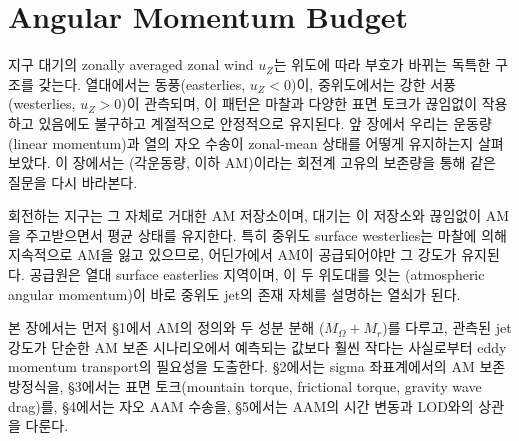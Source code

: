 %

\section{Angular Momentum Budget}

지구 대기의 zonally averaged zonal wind $u_Z$는 위도에 따라 부호가 바뀌는
독특한 구조를 갖는다.  열대에서는 동풍(easterlies, $u_Z < 0$)이, 중위도에서는
강한 서풍(westerlies, $u_Z > 0$)이 관측되며, 이 패턴은 마찰과 다양한
표면 토크가 끊임없이 작용하고 있음에도 불구하고 계절적으로 안정적으로 유지된다.
앞 장에서 우리는 운동량(linear momentum)과 열의 자오 수송이 zonal-mean 상태를
어떻게 유지하는지 살펴보았다.  이 장에서는  (각운동량,
이하 AM)이라는 회전계 고유의 보존량을 통해 같은 질문을 다시 바라본다.

회전하는 지구는 그 자체로 거대한 AM 저장소이며, 대기는 이 저장소와 끊임없이
AM을 주고받으면서 평균 상태를 유지한다.  특히 중위도 surface westerlies는 마찰에
의해 지속적으로 AM을 잃고 있으므로, 어딘가에서 AM이 공급되어야만 그 강도가
유지된다.  공급원은 열대 surface easterlies 지역이며, 이 두 위도대를 잇는
 (atmospheric angular momentum)이 바로
중위도 jet의 존재 자체를 설명하는 열쇠가 된다.

본 장에서는 먼저 \S1에서 AM의 정의와 두 성분 분해 ($M_\Omega + M_r$)를 다루고,
관측된 jet 강도가 단순한 AM 보존 시나리오에서 예측되는 값보다 훨씬 작다는 사실로부터
eddy momentum transport의 필요성을 도출한다.  \S2에서는 sigma 좌표계에서의 AM
보존 방정식을, \S3에서는 표면 토크(mountain torque, frictional torque, gravity wave
drag)를, \S4에서는 자오 AAM 수송을, \S5에서는 AAM의 시간 변동과 LOD와의 상관을
다룬다.



